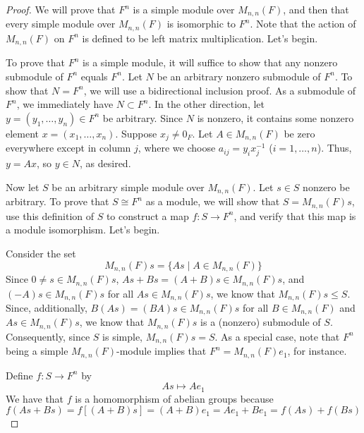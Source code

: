 \documentclass[../psets.tex]{subfiles}
\begin{document}
\begin{enumerate}
\begin{enumerate}
\begin{proof}
            We will prove that $F^n$ is a simple module over $M_{n,n}(F)$, and then that every simple module over $M_{n,n}(F)$ is isomorphic to $F^n$. Note that the action of $M_{n,n}(F)$ on $F^n$ is defined to be left matrix multiplication. Let's begin.\par\smallskip
            To prove that $F^n$ is a simple module, it will suffice to show that any nonzero submodule of $F^n$ equals $F^n$. Let $N$ be an arbitrary nonzero submodule of $F^n$. To show that $N=F^n$, we will use a bidirectional inclusion proof. As a submodule of $F^n$, we immediately have $N\subset F^n$. In the other direction, let $y=(y_1,\dots,y_n)\in F^n$ be arbitrary. Since $N$ is nonzero, it contains some nonzero element $x=(x_1,\dots,x_n)$. Suppose $x_j\neq 0_F$. Let $A\in M_{n,n}(F)$ be zero everywhere except in column $j$, where we choose $a_{ij}=y_ix_j^{-1}$ ($i=1,\dots,n$). Thus, $y=Ax$, so $y\in N$, as desired.\par\smallskip
            Now let $S$ be an arbitrary simple module over $M_{n,n}(F)$. Let $s\in S$ nonzero be arbitrary. To prove that $S\cong F^n$ as a module, we will show that $S=M_{n,n}(F)s$, use this definition of $S$ to construct a map $f:S\to F^n$, and verify that this map is a module isomorphism. Let's begin.\par
            Consider the set
            \begin{equation*}
                M_{n,n}(F)s = \{As\mid A\in M_{n,n}(F)\}
            \end{equation*}
            Since $0\neq s\in M_{n,n}(F)s$, $As+Bs=(A+B)s\in M_{n,n}(F)s$, and $(-A)s\in M_{n,n}(F)s$ for all $As\in M_{n,n}(F)s$, we know that $M_{n,n}(F)s\leq S$. Since, additionally, $B(As)=(BA)s\in M_{n,n}(F)s$ for all $B\in M_{n,n}(F)$ and $As\in M_{n,n}(F)s$, we know that $M_{n,n}(F)s$ is a (nonzero) submodule of $S$. Consequently, since $S$ is simple, $M_{n,n}(F)s=S$. As a special case, note that $F^n$ being a simple $M_{n,n}(F)$-module implies that $F^n=M_{n,n}(F)e_1$, for instance.\par
            Define $f:S\to F^n$ by
            \begin{equation*}
                As \mapsto Ae_1
            \end{equation*}
            We have that $f$ is a homomorphism of abelian groups because
            \begin{equation*}
                f(As+Bs) = f[(A+B)s]
                = (A+B)e_1
                = Ae_1+Be_1
                = f(As)+f(Bs)
            \end{equation*}

\end{proof}
\end{enumerate}
\end{enumerate}
\end{document}
